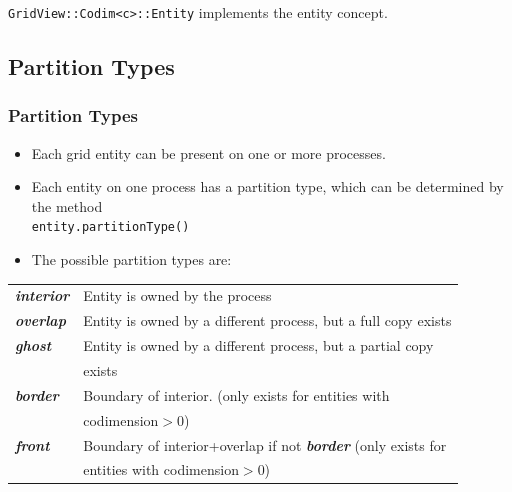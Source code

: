 \documentclass[aspectratio=169,11pt]{beamer}
\theoremstyle{definition}
\begin{document}
\begin{frame}
  \lstinline!GridView::Codim<c>::Entity!
  implements the entity concept.

\end{frame}

\subsection{Partition Types}
\begin{frame}[fragile]
\frametitle<presentation>{Partition Types}

\begin{itemize}
\item Each grid entity can be present on one or more processes.
\item Each entity on one process has a partition type, which can be determined
by the method\\
        \hspace*{1cm}\lstinline!entity.partitionType()!
\item The possible partition types are:\\
\end{itemize}
\begin{tabular}{ll}
  \em \bfseries interior
  & Entity is owned by the process\\
  \em \bfseries overlap & Entity is owned by a different process, but a full copy exists\\
  \em \bfseries ghost
  & Entity is owned by a different process, but a partial copy\\
  & exists\\
  \em \bfseries border
  & Boundary of interior. (only exists for entities with \\
  & codimension$>$0)\\
  \em \bfseries front
  & Boundary of interior+overlap if not {\em \bfseries border} (only exists for\\
  & entities with codimension$>$0)
\end{tabular}
\end{frame}
\end{document}

